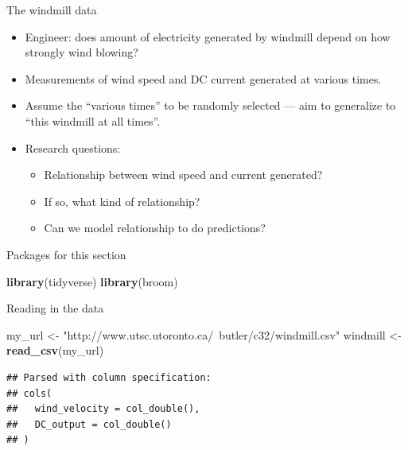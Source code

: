\documentclass[
  ignorenonframetext,
]{beamer}
\newenvironment{Shaded}{\begin{snugshade}}{\end{snugshade}}
\newcommand{\KeywordTok}[1]{\textcolor[rgb]{0.13,0.29,0.53}{\textbf{#1}}}
\newcommand{\NormalTok}[1]{#1}
\newcommand{\StringTok}[1]{\textcolor[rgb]{0.31,0.60,0.02}{#1}}
\providecommand{\tightlist}{%
  \setlength{\itemsep}{0pt}\setlength{\parskip}{0pt}}
\begin{document}
\begin{frame}{The windmill data}
\protect\hypertarget{the-windmill-data}{}

\begin{itemize}
\tightlist
\item
  Engineer: does amount of electricity generated by windmill depend on
  how strongly wind blowing?
\item
  Measurements of wind speed and DC current generated at various times.
\item
  Assume the ``various times'' to be randomly selected --- aim to
  generalize to ``this windmill at all times''.
\item
  Research questions:

  \begin{itemize}
  \tightlist
  \item
    Relationship between wind speed and current generated?
  \item
    If so, what kind of relationship?
  \item
    Can we model relationship to do predictions?
  \end{itemize}
\end{itemize}

\end{frame}

\begin{frame}[fragile]{Packages for this section}
\protect\hypertarget{packages-for-this-section-5}{}

\begin{Shaded}
\begin{Highlighting}[]
\KeywordTok{library}\NormalTok{(tidyverse)}
\KeywordTok{library}\NormalTok{(broom)}
\end{Highlighting}
\end{Shaded}

\end{frame}

\begin{frame}[fragile]{Reading in the data}
\protect\hypertarget{reading-in-the-data}{}

\begin{Shaded}
\begin{Highlighting}[]
\NormalTok{my_url <-}\StringTok{ "http://www.utsc.utoronto.ca/~butler/c32/windmill.csv"}
\NormalTok{windmill <-}\StringTok{ }\KeywordTok{read_csv}\NormalTok{(my_url)}
\end{Highlighting}
\end{Shaded}

\begin{verbatim}
## Parsed with column specification:
## cols(
##   wind_velocity = col_double(),
##   DC_output = col_double()
## )
\end{verbatim}

\end{frame}
\end{document}
